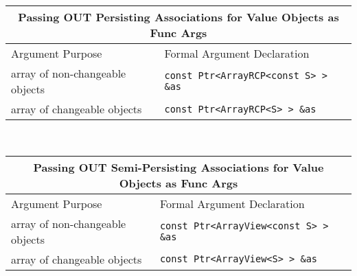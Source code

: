 %
\begin{tabular}{|l|l|}
%
\multicolumn{2}{c}{\textbf{Passing OUT Persisting Associations for Value Objects as Func Args}} \\
%
\hline
Argument Purpose
& Formal Argument Declaration \\
\hline
\hline
array of non-changeable objects
& {}\texttt{const Ptr<ArrayRCP<const S> > \&as} \\
\hline
array of changeable objects
& {}\texttt{const Ptr<ArrayRCP<S> > \&as} \\
\hline
\end{tabular} \\[3ex]
%
\begin{tabular}{|l|l|}
%
\multicolumn{2}{c}{\textbf{Passing OUT Semi-Persisting Associations for Value Objects as Func Args}} \\
%
\hline
Argument Purpose
& Formal Argument Declaration \\
\hline
array of non-changeable objects
& {}\texttt{const Ptr<ArrayView<const S> > \&as} \\
\hline
array of changeable objects
& {}\texttt{const Ptr<ArrayView<S> > \&as} \\
\hline
\end{tabular}
